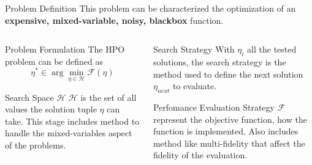 \begin{frame}{Problem Definition}
    This problem can be characterized the optimization of an \large\textbf{expensive, mixed-variable, noisy, blackbox} function.

    \begin{columns}
    
        \begin{column}[t]{0.5\textwidth}
        \begin{block}{Problem Formulation}
            The HPO problem can be defined as 
            \begin{equation}
               \eta^* \in \arg\min_{\eta \in \mathcal{H}} \mathcal{F}(\eta) 
            \end{equation}

        \end{block}

        \begin{block}{Search Space $\mathcal{H}$}
            $\mathcal{H}$ is the set of all values the solution tuple $\eta$ can take. This stage includes method to handle the mixed-variables aspect of the problems.   
        \end{block}
        \end{column}
        
        \begin{column}[t]{0.5\textwidth}

    
        \begin{block}{Search Strategy}
            With $\eta_i$ all the tested solutions, the search strategy is the method used to define the next solution $\eta_{next}$ to evaluate. 
        \end{block}

        \begin{block}{Perfomance Evaluation Strategy}
            $\mathcal{F}$ represent the objective function, how the function is implemented. Also includes method like multi-fidelity that affect the fidelity of the evaluation.
        \end{block}

        \end{column}
         
  \end{columns}
\end{frame}


